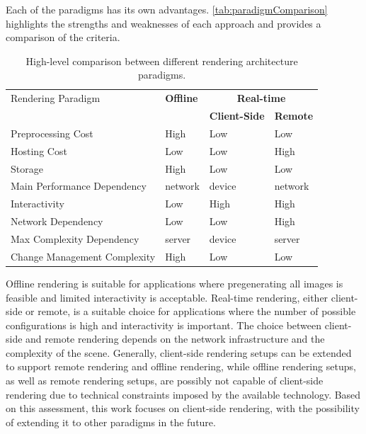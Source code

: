 Each of the paradigms has its own advantages. \autoref{tab:paradigmComparison} highlights the strengths and weaknesses of each approach and provides a comparison of the criteria.

\begin{table}[H]
  \centering
  \begin{tabular}{@{}p{5cm}p{2.5cm}p{2.5cm}p{2.5cm}@{}}
    \toprule
    Rendering Paradigm                    & \textbf{Offline} & \multicolumn{2}{c}{\textbf{Real-time}}                   \\
                                          &                  & \textbf{Client-Side}                   & \textbf{Remote} \\
    Preprocessing Cost                    & High             & Low                                    & Low             \\
    Hosting Cost                          & Low              & Low                                    & High            \\
    Storage                               & High             & Low                                    & Low             \\
    Main Performance \newline Dependency  & network          & device                                 & network         \\
    Interactivity                         & Low              & High                                   & High            \\
    Network Dependency                    & Low              & Low                                    & High            \\
    Max Complexity Dependency             & server           & device                                 & server          \\
    Change Management \newline Complexity & High             & Low                                    & Low             \\
    \bottomrule
  \end{tabular}
  \caption{High-level comparison between different rendering architecture paradigms.}
  \label{tab:paradigmComparison}
\end{table}

Offline rendering is suitable for applications where pregenerating all images is feasible and limited interactivity is acceptable. Real-time rendering, either client-side or remote, is a suitable choice for applications where the number of possible configurations is high and interactivity is important. The choice between client-side and remote rendering depends on the network infrastructure and the complexity of the scene.
Generally, client-side rendering setups can be extended to support remote rendering and offline rendering, while offline rendering setups, as well as remote rendering setups, are possibly not capable of client-side rendering due to technical constraints imposed by the available technology. Based on this assessment, this work focuses on client-side rendering, with the possibility of extending it to other paradigms in the future.

